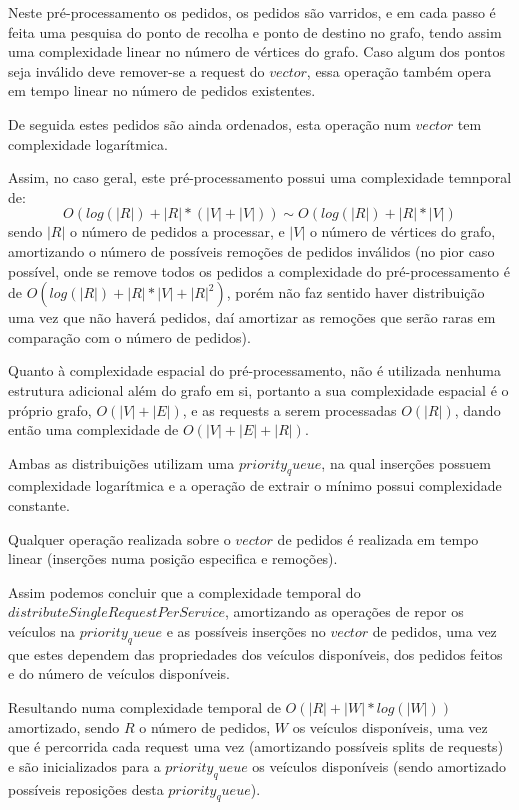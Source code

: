 \documentclass[article, a4paper, 12pt, oneside]{memoir}
\begin{document}
Neste pré-processamento os pedidos, os pedidos são varridos, e em cada passo é feita uma pesquisa do ponto de recolha e ponto de destino no grafo, tendo assim uma complexidade linear no número de vértices do grafo. Caso algum dos pontos seja inválido deve remover-se a request do $vector$, essa operação também opera em tempo linear no número de pedidos existentes.

De seguida estes pedidos são ainda ordenados, esta operação num $vector$ tem complexidade logarítmica.

Assim, no caso geral, este pré-processamento possui uma complexidade temnporal de:
\begin{equation}
O(log(|R|) + |R| * (|V| + |V|)) \sim O(log(|R|) + |R|*|V|)
\end{equation}
sendo $|R|$ o número de pedidos a processar, e $|V|$ o número de vértices do grafo, amortizando o número de possíveis remoções de pedidos inválidos (no pior caso possível, onde se remove todos os pedidos a complexidade do pré-processamento é de $O(log(|R|) + |R|*|V| + |R|^2)$, porém não faz sentido haver distribuição uma vez que não haverá pedidos, daí amortizar as remoções que serão raras em comparação com o número de pedidos).

Quanto à complexidade espacial do pré-processamento, não é utilizada nenhuma estrutura adicional além do grafo em si, portanto a sua complexidade espacial é o próprio grafo, $O(|V|+|E|)$, e as requests a serem processadas $O(|R|)$, dando então uma complexidade de $O(|V|+|E|+|R|)$.

Ambas as distribuições utilizam uma $priority_queue$, na qual inserções possuem complexidade logarítmica e a operação de extrair o mínimo possui complexidade constante.

Qualquer operação realizada sobre o $vector$ de pedidos é realizada em tempo linear (inserções numa posição especifica e remoções).

Assim podemos concluir que a complexidade temporal do $distributeSingleRequestPerService$, amortizando as operações de repor os veículos na $priority_queue$ e as possíveis inserções no $vector$ de pedidos, uma vez que estes dependem das propriedades dos veículos disponíveis, dos pedidos feitos e do número de veículos disponíveis.

Resultando numa complexidade temporal de $O(|R|+|W|*log(|W|))$ amortizado, sendo $R$ o número de pedidos, $W$ os veículos disponíveis, uma vez que é percorrida cada request uma vez (amortizando possíveis splits de requests) e são inicializados para a $priority_queue$ os veículos disponíveis (sendo amortizado possíveis reposições desta $priority_queue$).
\end{document}
